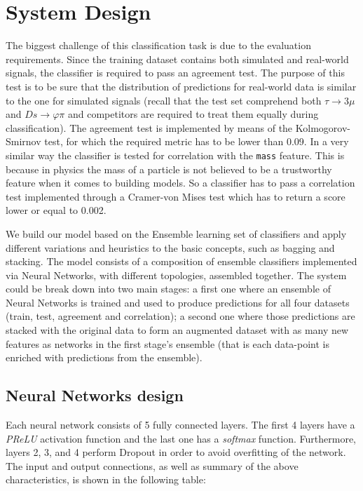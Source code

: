 \documentclass[conference]{IEEEtran}
\begin{document}
\section{System Design}
\label{sec:system_design}
The biggest challenge of this classification task is due to the evaluation
requirements. Since the training dataset contains both simulated and real-world
signals, the classifier is required to pass an agreement test. The purpose of
this test is to be sure that the distribution of predictions for real-world data
is similar to the one for simulated signals (recall that the test set comprehend
both $\tau \rightarrow 3\mu$ and $Ds \rightarrow \varphi\pi$ and competitors are
required to treat them equally during classification). The agreement test is
implemented by means of the Kolmogorov-Smirnov test, for which the required
metric has to be lower than 0.09. In a very similar way the classifier is
tested for correlation with the \texttt{mass} feature. This is because in physics the
mass of a particle is not believed to be a trustworthy feature when it comes to
building models. So a classifier has to pass a correlation test implemented
through a Cramer-von Mises test which has to return a score lower or equal to
0.002.

We build our model based on the Ensemble learning set of classifiers and apply
different variations and heuristics to the basic concepts, such as bagging and
stacking. The model consists of a composition of ensemble classifiers
implemented via Neural Networks, with different topologies,
assembled together. The system could be break down into two main stages: a first
one where an ensemble of Neural Networks is trained and used to produce
predictions for all four datasets (train, test, agreement and correlation); a
second one where those predictions are stacked with the original data to form an
augmented dataset with as many new features as networks in the first stage's
ensemble (that is each data-point is enriched with predictions from the
ensemble).


\subsection{Neural Networks design}
\label{sec:NN_design}
Each neural network consists of 5 fully connected layers. The first 4 layers
have a \textit{PReLU} activation function and the last one has a
\textit{softmax} function. Furthermore, layers 2, 3, and 4 perform Dropout in
order to avoid overfitting of the network. The input and output connections, as
well as summary of the above characteristics, is shown in the following table:
\end{document}
